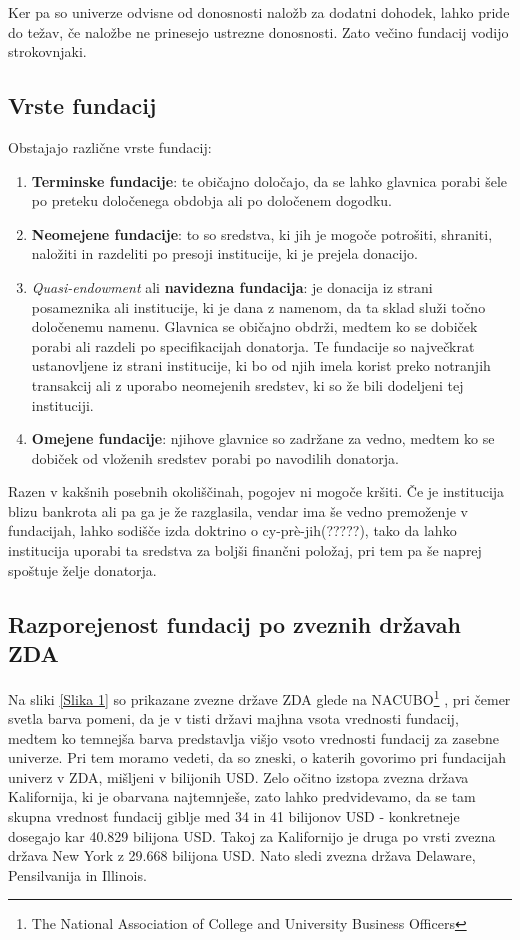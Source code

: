 \documentclass[12pt, a4paper]{article}
\begin{document}
Ker pa so univerze odvisne od donosnosti naložb za dodatni dohodek, lahko pride do težav, če naložbe ne prinesejo ustrezne donosnosti. Zato večino fundacij vodijo strokovnjaki.\\


\subsection{Vrste fundacij}
Obstajajo različne vrste fundacij:
\begin{enumerate}
\item \textbf{Terminske fundacije}: te običajno določajo, da se lahko glavnica porabi šele po preteku določenega obdobja ali po določenem dogodku.
\item \textbf{Neomejene fundacije}: to so sredstva, ki jih je mogoče potrošiti, shraniti, naložiti in razdeliti po presoji institucije, ki je prejela donacijo.
\item \textit{Quasi-endowment} ali \textbf{navidezna fundacija}: je donacija iz strani posameznika ali institucije, ki je dana z namenom, da ta sklad služi točno določenemu namenu. Glavnica se običajno obdrži, medtem ko se dobiček porabi ali razdeli po specifikacijah donatorja. Te fundacije so največkrat ustanovljene iz strani institucije, ki bo od njih imela korist preko notranjih transakcij ali z uporabo neomejenih sredstev, ki so že bili dodeljeni tej instituciji.
\item \textbf{Omejene fundacije}: njihove glavnice so zadržane za vedno, medtem ko se dobiček od vloženih sredstev porabi po navodilih donatorja.
\end{enumerate}

Razen v kakšnih posebnih okoliščinah, pogojev ni mogoče kršiti. Če je institucija blizu bankrota ali pa ga je že razglasila, vendar ima še vedno premoženje v fundacijah, lahko sodišče izda doktrino o cy-prè-jih(?????), tako da lahko institucija uporabi ta sredstva za boljši finančni položaj, pri tem pa še naprej spoštuje želje donatorja.

\subsection{Razporejenost fundacij po zveznih državah ZDA}

Na sliki \ref{Slika 1}  so prikazane zvezne države ZDA glede na NACUBO\footnote{The National Association of College and University Business Officers} \cite{wiki}, pri čemer svetla barva pomeni, da je v tisti državi majhna vsota vrednosti fundacij, medtem ko temnejša barva predstavlja višjo vsoto vrednosti fundacij za zasebne univerze. Pri tem moramo vedeti, da so zneski, o katerih govorimo pri fundacijah univerz v ZDA, mišljeni v bilijonih USD. Zelo očitno izstopa zvezna država Kalifornija, ki je obarvana najtemnješe, zato lahko predvidevamo, da se tam skupna vrednost fundacij giblje med 34 in 41 bilijonov USD - konkretneje dosegajo kar 40.829 bilijona USD. Takoj za Kalifornijo je druga po vrsti zvezna država New York z 29.668 bilijona USD. Nato sledi zvezna država Delaware, Pensilvanija in Illinois. \\
\end{document}
